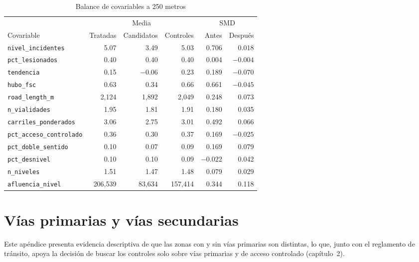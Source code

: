 \begin{table}[htbp]
    \centering
    \caption{Balance de covariables a 250 metros}
    \label{tab:balance-250}
    \footnotesize
    \setlength{\tabcolsep}{4pt}
    \begin{tabular}{l r r r r r}
        \toprule
        & \multicolumn{3}{c}{Media} & \multicolumn{2}{c}{SMD} \\
        \cmidrule(lr){2-4} \cmidrule(lr){5-6}
        Covariable & Tratadas & Candidatos & Controles & Antes & Después \\
        \midrule
        \texttt{nivel\_incidentes} & 5.07 & 3.49 & 5.03 & 0.706 & 0.018 \\
        \texttt{pct\_lesionados} & 0.40 & 0.40 & 0.40 & 0.004 & $-0.004$ \\
        \texttt{tendencia} & 0.15 & $-0.06$ & 0.23 & 0.189 & $-0.070$ \\
        \texttt{hubo\_fsc} & 0.63 & 0.34 & 0.66 & 0.661 & $-0.045$ \\
        \texttt{road\_length\_m} & 2,124 & 1,892 & 2,049 & 0.248 & 0.073 \\
        \texttt{n\_vialidades} & 1.95 & 1.81 & 1.91 & 0.180 & 0.035 \\
        \texttt{carriles\_ponderados} & 3.06 & 2.75 & 3.01 & 0.492 & 0.066 \\
        \texttt{pct\_acceso\_controlado} & 0.36 & 0.30 & 0.37 & 0.169 & $-0.025$ \\
        \texttt{pct\_doble\_sentido} & 0.10 & 0.07 & 0.09 & 0.169 & 0.079 \\
        \texttt{pct\_desnivel} & 0.10 & 0.10 & 0.09 & $-0.022$ & 0.042 \\
        \texttt{n\_niveles} & 1.51 & 1.47 & 1.48 & 0.079 & 0.029 \\
        \texttt{afluencia\_nivel} & 206,539 & 83,634 & 157,414 & 0.344 & 0.118 \\
        \bottomrule
    \end{tabular}
\end{table}

\chapter{Vías primarias y vías secundarias}
\label{apendice:vias}

\noindent Este apéndice presenta evidencia descriptiva de que las zonas con y sin vías primarias son distintas, lo que, junto con el reglamento de tránsito, apoya la decisión de buscar los controles solo sobre vías primarias y de acceso controlado (capítulo~2).\\

